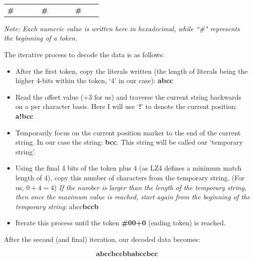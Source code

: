 \documentclass[12pt]{article}
\begin{document}
	\begin{center}
		\setlength{\tabcolsep}{1pt}
		\begin{tabular}{c c c c c c c c c c c}
			\textbf{\#} & \textbf{\cellcolor{myyellow}{40}} & \textbf{\cellcolor{myblue}{abcc}} & \textbf{\cellcolor{mygrey}{+3}} & \textbf{\#} & \textbf{\cellcolor{myyellow}{13}} & \textbf{\cellcolor{myblue}{b}} & \textbf{\cellcolor{mygrey}{+9}} & \textbf{\#} & \textbf{\cellcolor{myyellow}{00}} & \textbf{\cellcolor{mygrey}{+0}}
		\end{tabular}
	\end{center}
	
	\emph{Note: Each numeric value is written here in hexadecimal, while ``\#" represents the beginning of a token.}
	
	The iterative process to decode the data is as follows:
	
	\begin{itemize}
		\item After the first token, copy the literals written (the length of literals being the higher 4-bits within the token, `4' in our case): \textbf{abcc}
		
		\item Read the offset value (+3 for us) and traverse the current string backwards on a per character basis. Here I will use `\textbf{!}' to denote the current position: \textbf{a!bcc}
		
		\item Temporarily focus on the current position marker to the end of the current string. In our case the string: \textbf{bcc}. This string will be called our `temporary string'.
		
		\item Using the final 4 bits of the token plus 4 (as LZ4 defines a minimum match length of 4), copy this number of characters from the temporary string. (For us, $0+4=4$) \emph{If the number is larger than the length of the temporary string, then once the maximum value is reached, start again from the beginning of the temporary string}: abcc\textbf{bccb}
		
		\item Iterate this process until the token \textbf{\#00+0} (ending token) is reached.
	\end{itemize}

	After the second (and final) iteration, our decoded data becomes:
	
	\begin{equation*}
		\textbf{abccbccbbabccbcc}
	\end{equation*}
\end{document}
